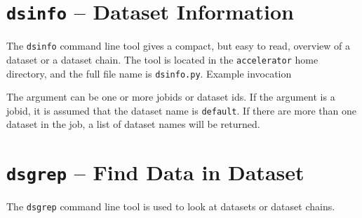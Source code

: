 
\section{\texttt{dsinfo} -- Dataset Information}
The \texttt{dsinfo} command line tool gives a compact, but easy to
read, overview of a dataset or a dataset chain.  The tool is located
in the \texttt{accelerator} home directory, and the full file name is
\texttt{dsinfo.py}.  Example invocation
\begin{shell}
\end{shell}
The argument can be one or more jobids or dataset ids.  If the
argument is a jobid, it is assumed that the dataset name is
\texttt{default}.  If there are more than one dataset in the job, a
list of dataset names will be returned.


\section{\texttt{dsgrep} -- Find Data in Dataset}
The \texttt{dsgrep} command line tool is used to look at datasets or
dataset chains.
